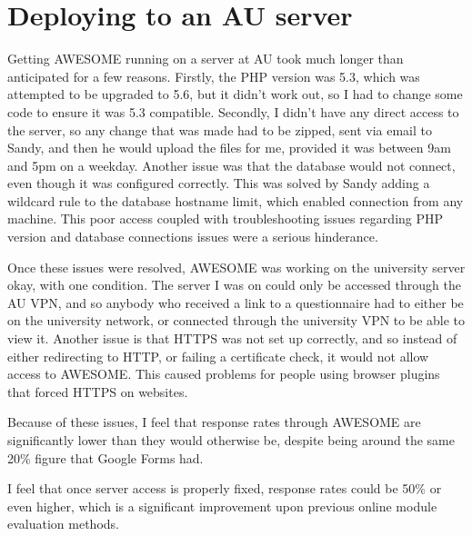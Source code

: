 	
	
	\section{Deploying to an \ac{AU} server}
	\label{sec:auserverimp}
	
	Getting \ac{AWESOME} running on a server at \ac{AU} took much longer than anticipated for a few reasons.
	Firstly, the PHP version was 5.3, which was attempted to be upgraded to 5.6, but it didn't work out, so I had to change some code to ensure it was 5.3 compatible.
	Secondly, I didn't have any direct access to the server, so any change that was made had to be zipped, sent via email to Sandy, and then he would upload the files for me, provided it was between 9am and 5pm on a weekday.
	Another issue was that the database would not connect, even though it was configured correctly.
	This was solved by Sandy adding a wildcard rule to the database hostname limit, which enabled connection from any machine.
	This poor access coupled with troubleshooting issues regarding PHP version and database connections issues were a serious hinderance.
	
	Once these issues were resolved, \ac{AWESOME} was working on the university server okay, with one condition.
	The server I was on could only be accessed through the \ac{AU} \ac{VPN}, and so anybody who received a link to a questionnaire had to either be on the university network, or connected through the university VPN to be able to view it.
	Another issue is that HTTPS was not set up correctly, and so instead of either redirecting to HTTP, or failing a certificate check, it would not allow access to \ac{AWESOME}.
	This caused problems for people using browser plugins that forced HTTPS on websites.
	
	Because of these issues, I feel that response rates through \ac{AWESOME} are significantly lower than they would otherwise be, despite being around the same 20\% figure that Google Forms had.
	
	I feel that once server access is properly fixed, response rates could be 50\% or even higher, which is a significant improvement upon previous online module evaluation methods.